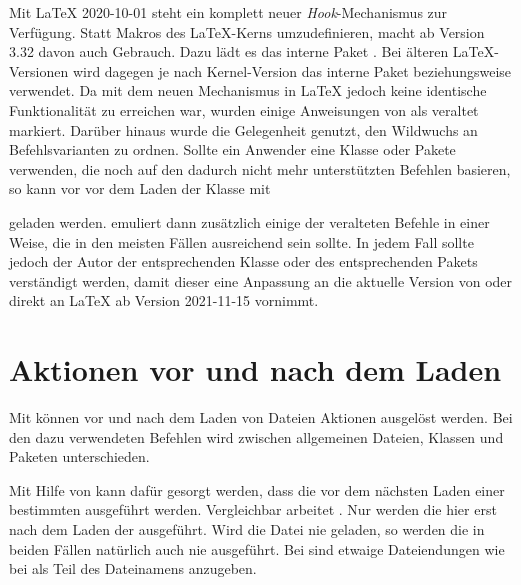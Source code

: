 \begin{Declaration}
\end{Declaration}
Mit \LaTeX{} 2020-10-01 steht ein
komplett neuer \emph{Hook}-Mechanismus zur Verfügung. Statt Makros des
\LaTeX-Kerns umzudefinieren, macht  ab Version 3.32 davon
auch Gebrauch. Dazu lädt es das interne Paket
. Bei älteren
\LaTeX-Versionen wird dagegen je
 nach Kernel-Version das interne Paket
beziehungsweise %
 verwendet. Da mit dem neuen
Mechanismus in \LaTeX{} jedoch keine identische Funktionalität zu erreichen
war, wurden einige Anweisungen von  als veraltet
markiert. Darüber hinaus wurde die Gelegenheit genutzt, den Wildwuchs an
Befehlsvarianten zu ordnen. Sollte ein Anwender eine Klasse oder Pakete
verwenden, die noch auf den dadurch nicht mehr unterstützten Befehlen
basieren, so kann vor  vor dem Laden der Klasse mit
\begin{lstcode}
  \RequirePackage[withdeprecated]{scrlfile}
\end{lstcode}
geladen werden.  emuliert dann zusätzlich einige der
veralteten Befehle in einer Weise, die in den meisten Fällen ausreichend sein
sollte. In jedem Fall sollte jedoch der Autor der entsprechenden Klasse oder
des entsprechenden Pakets verständigt werden, damit dieser eine Anpassung an
die aktuelle Version von  oder direkt an \LaTeX{} ab Version
2021-11-15 vornimmt.%
%
\EndIndexGroup


\section{Aktionen vor und nach dem Laden}

Mit  können vor und nach dem Laden von Dateien Aktionen
ausgelöst werden. Bei den dazu verwendeten Befehlen wird zwischen allgemeinen
Dateien, Klassen und Paketen unterschieden.


\begin{Declaration}
\end{Declaration}%
Mit Hilfe von  kann dafür gesorgt werden, dass die
 vor dem nächsten Laden einer bestimmten 
ausgeführt werden. Vergleichbar arbeitet . Nur werden die
 hier erst nach dem Laden der 
ausgeführt. Wird die Datei nie geladen, so werden die  in
beiden Fällen natürlich auch nie ausgeführt. Bei  sind etwaige
Dateiendungen wie bei  als Teil des Dateinamens anzugeben.

